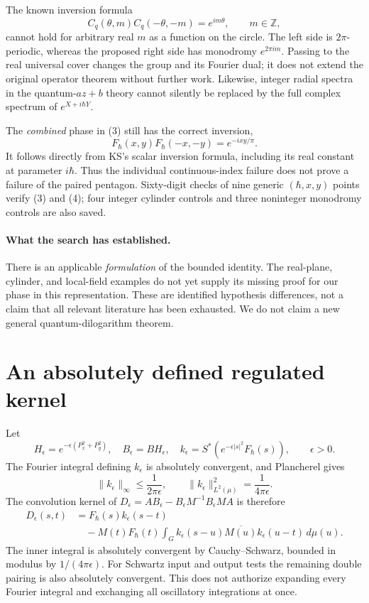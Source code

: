 \documentclass[11pt,a4paper]{article}
\newcommand{\Z}{\mathbb Z}
\newcommand{\F}{F_\hbar}
\begin{document}
The known inversion formula
\[
 C_q(\theta,m)C_q(-\theta,-m)=e^{im\theta},\qquad m\in\Z,
\]
cannot hold for arbitrary real $m$ as a function on the circle.
The left side is $2\pi$-periodic, whereas the proposed right side
has monodromy $e^{2\pi im}$. Passing to the real universal cover
changes the group and its Fourier dual; it does not extend the
original operator theorem without further work. Likewise, integer
radial spectra in the quantum-$az+b$ theory cannot silently be
replaced by the full complex spectrum of $e^{X+i\hbar Y}$.

The \emph{combined} phase in (3) still has the correct inversion,
\[
 \F(x,y)\F(-x,-y)=e^{-ixy/\pi}. \tag{4}
\]
It follows directly from KS's scalar inversion formula, including
its real constant at parameter $i\hbar$. Thus the individual
continuous-index failure does not prove a failure of the paired
pentagon. Sixty-digit checks of nine generic $(\hbar,x,y)$ points
verify (3) and (4); four integer cylinder controls and three
noninteger monodromy controls are also saved.

\paragraph{What the search has established.}
There is an applicable \emph{formulation} of the bounded identity.
The real-plane, cylinder, and local-field examples do not yet
supply its missing proof for our phase in this representation.
These are identified hypothesis differences, not a claim that
all relevant literature has been exhausted. We do not claim a
new general quantum-dilogarithm theorem.

\newpage
\section{An absolutely defined regulated kernel}
Let
\[
 H_\epsilon=e^{-\epsilon(P_x^2+P_y^2)},\quad
 B_\epsilon=BH_\epsilon,\quad
 k_\epsilon=S^*(e^{-\epsilon|s|^2}\F(s)),\qquad\epsilon>0.
\]
The Fourier integral defining $k_\epsilon$ is absolutely convergent,
and Plancherel gives
\[
 \|k_\epsilon\|_\infty\leq\frac1{2\pi\epsilon},
 \qquad
 \|k_\epsilon\|_{L^2(\mu)}^2=\frac1{4\pi\epsilon}.
\]
The convolution kernel of
$D_\epsilon=AB_\epsilon-B_\epsilon M^{-1}B_\epsilon MA$ is therefore
\begin{align*}
 D_\epsilon(s,t)
 &=\F(s)k_\epsilon(s-t)\\
 &\quad-M(t)\F(t)\int_G
 k_\epsilon(s-u)\overline{M(u)}k_\epsilon(u-t)\,d\mu(u).
\end{align*}
The inner integral is absolutely convergent by Cauchy--Schwarz,
bounded in modulus by $1/(4\pi\epsilon)$. For Schwartz input and
output tests the remaining double pairing is also absolutely
convergent. This does not authorize expanding every Fourier
integral and exchanging all oscillatory integrations at once.
\end{document}
